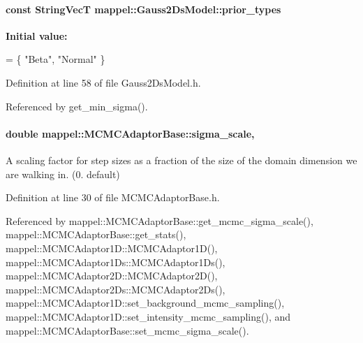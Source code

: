 \paragraph[{\texorpdfstring{prior\+\_\+types}{prior_types}}]{\setlength{\rightskip}{0pt plus 5cm}const {\bf String\+VecT} mappel\+::\+Gauss2\+Ds\+Model\+::prior\+\_\+types\hspace{0.3cm}{\ttfamily [static]}}\hypertarget{classmappel_1_1Gauss2DsModel_a9c23ad32b75a80271a0d5ac24138c5ee}{}\label{classmappel_1_1Gauss2DsModel_a9c23ad32b75a80271a0d5ac24138c5ee}
{\bfseries Initial value\+:}
\begin{DoxyCode}
= \{ \textcolor{stringliteral}{"Beta"}, 
                                                \textcolor{stringliteral}{"Normal"}  
                                                 \}
\end{DoxyCode}


Definition at line 58 of file Gauss2\+Ds\+Model.\+h.



Referenced by get\+\_\+min\+\_\+sigma().

\paragraph[{\texorpdfstring{sigma\+\_\+scale}{sigma_scale}}]{\setlength{\rightskip}{0pt plus 5cm}double mappel\+::\+M\+C\+M\+C\+Adaptor\+Base\+::sigma\+\_\+scale\hspace{0.3cm}{\ttfamily [protected]}, {\ttfamily [inherited]}}\hypertarget{classmappel_1_1MCMCAdaptorBase_a76312f7d589bf3f3e754beca174b884b}{}\label{classmappel_1_1MCMCAdaptorBase_a76312f7d589bf3f3e754beca174b884b}
A scaling factor for step sizes as a fraction of the size of the domain dimension we are walking in. (0. default) 

Definition at line 30 of file M\+C\+M\+C\+Adaptor\+Base.\+h.



Referenced by mappel\+::\+M\+C\+M\+C\+Adaptor\+Base\+::get\+\_\+mcmc\+\_\+sigma\+\_\+scale(), mappel\+::\+M\+C\+M\+C\+Adaptor\+Base\+::get\+\_\+stats(), mappel\+::\+M\+C\+M\+C\+Adaptor1\+D\+::\+M\+C\+M\+C\+Adaptor1\+D(), mappel\+::\+M\+C\+M\+C\+Adaptor1\+Ds\+::\+M\+C\+M\+C\+Adaptor1\+Ds(), mappel\+::\+M\+C\+M\+C\+Adaptor2\+D\+::\+M\+C\+M\+C\+Adaptor2\+D(), mappel\+::\+M\+C\+M\+C\+Adaptor2\+Ds\+::\+M\+C\+M\+C\+Adaptor2\+Ds(), mappel\+::\+M\+C\+M\+C\+Adaptor1\+D\+::set\+\_\+background\+\_\+mcmc\+\_\+sampling(), mappel\+::\+M\+C\+M\+C\+Adaptor1\+D\+::set\+\_\+intensity\+\_\+mcmc\+\_\+sampling(), and mappel\+::\+M\+C\+M\+C\+Adaptor\+Base\+::set\+\_\+mcmc\+\_\+sigma\+\_\+scale().

